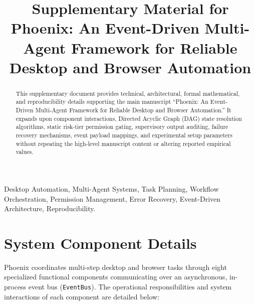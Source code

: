 \documentclass[conference]{IEEEtran}
\begin{document}
\title{Supplementary Material for\\Phoenix: An Event-Driven Multi-Agent Framework for Reliable Desktop and Browser Automation}

\author{
}

\maketitle

\begin{abstract}
This supplementary document provides technical, architectural, formal mathematical, and reproducibility details supporting the main manuscript ``Phoenix: An Event-Driven Multi-Agent Framework for Reliable Desktop and Browser Automation.'' It expands upon component interactions, Directed Acyclic Graph (DAG) state resolution algorithms, static risk-tier permission gating, supervisory output auditing, failure recovery mechanisms, event payload mappings, and experimental setup parameters without repeating the high-level manuscript content or altering reported empirical values.
\end{abstract}

\begin{IEEEkeywords}
Desktop Automation, Multi-Agent Systems, Task Planning, Workflow Orchestration, Permission Management, Error Recovery, Event-Driven Architecture, Reproducibility.
\end{IEEEkeywords}

\section{System Component Details}
\label{sec:components}
Phoenix coordinates multi-step desktop and browser tasks through eight specialized functional components communicating over an asynchronous, in-process event bus (\texttt{EventBus}). The operational responsibilities and system interactions of each component are detailed below:
\end{document}
